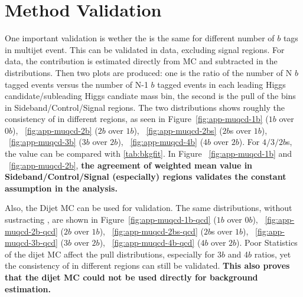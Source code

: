 \section{\muqcd Method Validation}
\label{app:muqcd-study}
One important validation is wether the \muqcd is the same for different number of $b$ tags in multijet event. This can be validated in data, excluding signal regions. For data, the \ttbar contribution is estimated directly from MC and subtracted in the distributions. Then two plots are produced: one is the ratio of the number of N $b$ tagged events versus the number of N-1 $b$ tagged events in each leading Higgs candidate/subleading Higgs candiate mass bin, the second is the pull of the bins in Sideband/Control/Signal regions. The two distributions shows roughly the consistency of \muqcd in different regions, as seen in Figure~\ref{fig:app-muqcd-1b} ($1b$ over $0b$), ~\ref{fig:app-muqcd-2b} ($2b$ over $1b$), ~\ref{fig:app-muqcd-2bs} ($2b$s over $1b$), ~\ref{fig:app-muqcd-3b} ($3b$ over $2b$), ~\ref{fig:app-muqcd-4b} ($4b$ over $2b$). For $4/3/2b$s, the \muqcd value can be compared with \ref{tab:bkgfit}. In Figure ~\ref{fig:app-muqcd-1b} and ~\ref{fig:app-muqcd-2b}, \textbf{the agreement of \muqcd weighted mean value in Sideband/Control/Signal (especially) regions validates the constant \muqcd assumption in the analysis.}

Also, the Dijet MC can be used for validation. The same distributions, without sustracting \ttbar, are shown in Figure~\ref{fig:app-muqcd-1b-qcd} ($1b$ over $0b$), ~\ref{fig:app-muqcd-2b-qcd} ($2b$ over $1b$), ~\ref{fig:app-muqcd-2bs-qcd} ($2b$s over $1b$), ~\ref{fig:app-muqcd-3b-qcd} ($3b$ over $2b$), ~\ref{fig:app-muqcd-4b-qcd} ($4b$ over $2b$).  Poor Statistics of the dijet MC affect the pull distributions, especially for 3$b$ and 4$b$ ratios, yet the consistency of \muqcd in different regions can still be validated. \textbf{This also proves that the dijet MC could not be used directly for background estimation.}

